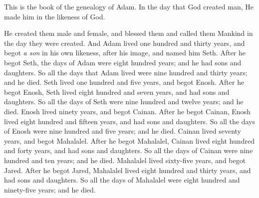 

\bverse This is the book of the genealogy of Adam. In the day that God created man, He made him in the likeness of God.

\bverse He created them male and female, and blessed them and called them Mankind in the day they were created.
\bverse And Adam lived one hundred and thirty years, and begot \textit{a son} in his own likeness, after his image, and named him Seth.
\bverse After he begot Seth, the days of Adam were eight hundred years; and he had sons and daughters.
\bverse So all the days that Adam lived were nine hundred and thirty years; and he died.
\bverse Seth lived one hundred and five years, and begot Enosh.
\bverse After he begot Enosh, Seth lived eight hundred and seven years, and had sons and daughters.
\bverse So all the days of Seth were nine hundred and twelve years; and he died.
\bverse Enosh lived ninety years, and begot Cainan.
\bverse After he begot Cainan, Enosh lived eight hundred and fifteen years, and had sons and daughters.
\bverse So all the days of Enosh were nine hundred and five years; and he died.
\bverse Cainan lived seventy years, and begot Mahalalel.
\bverse After he begot Mahalalel, Cainan lived eight hundred and forty years, and had sons and daughters.
\bverse So all the days of Cainan were nine hundred and ten years; and he died.
\bverse Mahalalel lived sixty-five years, and begot Jared. After he begot Jared, Mahalalel lived eight hundred and thirty years, and had sons and daughters. So all the days of Mahalalel were eight hundred and ninety-five years; and he died.
\bverse 
\bverse 
\bverse 
\bverse 
\bverse 
\bverse 
\bverse 
\bverse 
\bverse 
\bverse 
\bverse 
\bverse 
\bverse 
\bverse 
\bverse 
\bverse 
\bverse 
